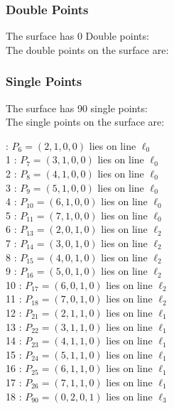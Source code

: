 \documentclass{article}
\begin{document}
{\subsubsection*{Double Points}
The surface has 0 Double points:\\
The double points on the surface are:\\
\begin{multicols}{2}
\noindent
\end{multicols}
\subsubsection*{Single Points}
The surface has 90 single points:\\
The single points on the surface are:\\
\begin{multicols}{2}
 : $P_{6}=( 2, 1, 0, 0 )$ lies on line $\ell_{0}$\\
1 : $P_{7}=( 3, 1, 0, 0 )$ lies on line $\ell_{0}$\\
2 : $P_{8}=( 4, 1, 0, 0 )$ lies on line $\ell_{0}$\\
3 : $P_{9}=( 5, 1, 0, 0 )$ lies on line $\ell_{0}$\\
4 : $P_{10}=( 6, 1, 0, 0 )$ lies on line $\ell_{0}$\\
5 : $P_{11}=( 7, 1, 0, 0 )$ lies on line $\ell_{0}$\\
6 : $P_{13}=( 2, 0, 1, 0 )$ lies on line $\ell_{2}$\\
7 : $P_{14}=( 3, 0, 1, 0 )$ lies on line $\ell_{2}$\\
8 : $P_{15}=( 4, 0, 1, 0 )$ lies on line $\ell_{2}$\\
9 : $P_{16}=( 5, 0, 1, 0 )$ lies on line $\ell_{2}$\\
10 : $P_{17}=( 6, 0, 1, 0 )$ lies on line $\ell_{2}$\\
11 : $P_{18}=( 7, 0, 1, 0 )$ lies on line $\ell_{2}$\\
12 : $P_{21}=( 2, 1, 1, 0 )$ lies on line $\ell_{1}$\\
13 : $P_{22}=( 3, 1, 1, 0 )$ lies on line $\ell_{1}$\\
14 : $P_{23}=( 4, 1, 1, 0 )$ lies on line $\ell_{1}$\\
15 : $P_{24}=( 5, 1, 1, 0 )$ lies on line $\ell_{1}$\\
16 : $P_{25}=( 6, 1, 1, 0 )$ lies on line $\ell_{1}$\\
17 : $P_{26}=( 7, 1, 1, 0 )$ lies on line $\ell_{1}$\\
18 : $P_{90}=( 0, 2, 0, 1 )$ lies on line $\ell_{3}$\\

\end{multicols}}
\end{document}
